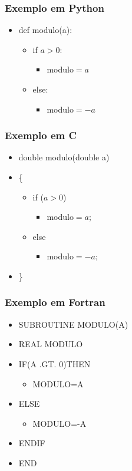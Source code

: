 \documentclass[hyperref={pdfpagelabels=false}]{beamer}
\begin{document}
\begin{frame}
   \frametitle{Exemplo em Python}
   \begin{center}
	\begin{itemize}
		\item[] def modulo(a):
		\begin{itemize}
			\item[] if $a > 0$:
			\begin{itemize}
				\item[] modulo$=a$
		   \end{itemize}
		   \item[] else:
		   \begin{itemize}
				\item[] modulo$=-a$
		   \end{itemize}
		\end{itemize}
	\end{itemize}
	\end{center}
\end{frame}
\begin{frame}
   \frametitle{Exemplo em C}
   \begin{center}
	\begin{itemize}
	   \item[] double modulo(double a) 
		\item[] \{
		\begin{itemize}
			\item[] if ($a > 0$)
			\begin{itemize}
				\item[] modulo$=a$;
		   \end{itemize}
		   \item[] else
		   \begin{itemize}
				\item[] modulo$=-a$;
		   \end{itemize}
		\end{itemize}
		\item[] \}
	\end{itemize}
	\end{center}
\end{frame}
\begin{frame}
   \frametitle{Exemplo em Fortran}
   \begin{center}
	\begin{itemize}
	   \item[] SUBROUTINE MODULO(A)
		\item[] REAL MODULO
		\item[] IF(A .GT. 0)THEN
		\begin{itemize}
			\item[] MODULO=A
		\end{itemize}
		\item[] ELSE
		\begin{itemize}
			\item[] MODULO=-A
		\end{itemize}
		\item[] ENDIF
		\item[] END
	\end{itemize}
	\end{center}
\end{frame}
\end{document}
